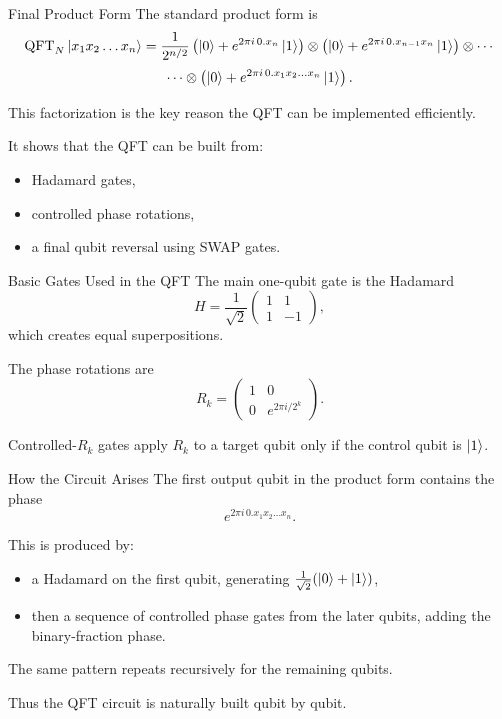 \documentclass{beamer}
\begin{document}
\begin{frame}{Final Product Form}
The standard product form is
\[
\operatorname{QFT}_N \ket{x_1x_2\dots x_n}
=
\frac{1}{2^{n/2}}
\left(\ket{0}+e^{2\pi i\,0.x_n}\ket{1}\right)
\otimes
\left(\ket{0}+e^{2\pi i\,0.x_{n-1}x_n}\ket{1}\right)
\otimes \cdots
\]
\[
\cdots \otimes
\left(\ket{0}+e^{2\pi i\,0.x_1x_2\dots x_n}\ket{1}\right).
\]

This factorization is the key reason the QFT can be implemented efficiently.

It shows that the QFT can be built from:
\begin{itemize}
\item Hadamard gates,
\item controlled phase rotations,
\item a final qubit reversal using SWAP gates.
\end{itemize}
\end{frame}

\begin{frame}{Basic Gates Used in the QFT}
The main one-qubit gate is the Hadamard
\[
H = \frac{1}{\sqrt 2}
\begin{pmatrix}
1 & 1 \\
1 & -1
\end{pmatrix},
\]
which creates equal superpositions.

The phase rotations are
\[
R_k =
\begin{pmatrix}
1 & 0 \\
0 & e^{2\pi i / 2^k}
\end{pmatrix}.
\]

Controlled-\(R_k\) gates apply \(R_k\) to a target qubit only if the control qubit is \(\ket{1}\).
\end{frame}

\begin{frame}{How the Circuit Arises}
The first output qubit in the product form contains the phase
\[
e^{2\pi i\,0.x_1x_2\dots x_n}.
\]

This is produced by:
\begin{itemize}
\item a Hadamard on the first qubit, generating \(\frac{1}{\sqrt2}(\ket0+\ket1)\),
\item then a sequence of controlled phase gates from the later qubits, adding the binary-fraction phase.
\end{itemize}

The same pattern repeats recursively for the remaining qubits.

Thus the QFT circuit is naturally built qubit by qubit.
\end{frame}
\end{document}
